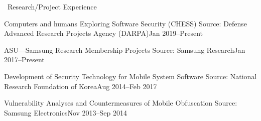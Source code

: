 \documentclass{resume} %
\begin{document}
\begin{rSection}{\faGenderless~Research/Project Experience}

    \begin{rSubsection3}
        {Computers and humans Exploring Software Security (CHESS)}
        {Source: Defense Advanced Research Projects Agency (DARPA)}{Jan 2019--Present}
    \end{rSubsection3}
    \vspace{-3mm}

	\begin{rSubsection3}
		{ASU---Samsung Research Membership Projects}
		{Source: Samsung Research}{Jan 2017--Present}
	\end{rSubsection3}
	\vspace{-3mm}
	\begin{rSubsection3}
		{Development of Security Technology for Mobile System Software}
		{Source: National Research Foundation of Korea}{Aug 2014--Feb 2017}
	\end{rSubsection3}
	\vspace{-3mm}
	\begin{rSubsection3}
		{Vulnerability Analyses and Countermeasures of Mobile Obfuscation}
		{Source: Samsung Electronics}{Nov 2013--Sep 2014}
	\end{rSubsection3}
	\vspace{-3mm}

\end{rSection}
\end{document}

